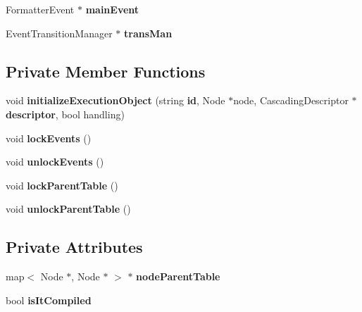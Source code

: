\begin{CompactItemize}
\item 
FormatterEvent $\ast$ {\bf mainEvent}\label{classbr_1_1pucrio_1_1telemidia_1_1ginga_1_1ncl_1_1model_1_1components_1_1ExecutionObject_b7790267ccb53f8cf74564a0da2d8261}

\item 
EventTransitionManager $\ast$ {\bf transMan}\label{classbr_1_1pucrio_1_1telemidia_1_1ginga_1_1ncl_1_1model_1_1components_1_1ExecutionObject_bb5ba1c2216437ee4bd70ac5b22b0826}

\end{CompactItemize}
\subsection*{Private Member Functions}
\begin{CompactItemize}
\item 
void \textbf{initializeExecutionObject} (string {\bf id}, Node $\ast$node, CascadingDescriptor $\ast${\bf descriptor}, bool handling)\label{classbr_1_1pucrio_1_1telemidia_1_1ginga_1_1ncl_1_1model_1_1components_1_1ExecutionObject_ba81c171ec5108aa5422aa5ea52d1dbf}

\item 
void \textbf{lockEvents} ()\label{classbr_1_1pucrio_1_1telemidia_1_1ginga_1_1ncl_1_1model_1_1components_1_1ExecutionObject_fb92f55eccafa46de5cbf8b19fb2ca66}

\item 
void \textbf{unlockEvents} ()\label{classbr_1_1pucrio_1_1telemidia_1_1ginga_1_1ncl_1_1model_1_1components_1_1ExecutionObject_ee9d0674bc2827922500f41e7c3e0849}

\item 
void \textbf{lockParentTable} ()\label{classbr_1_1pucrio_1_1telemidia_1_1ginga_1_1ncl_1_1model_1_1components_1_1ExecutionObject_fe60af0ddc72c507d98aa20687b1c7a7}

\item 
void \textbf{unlockParentTable} ()\label{classbr_1_1pucrio_1_1telemidia_1_1ginga_1_1ncl_1_1model_1_1components_1_1ExecutionObject_4c9ed6796c0c21f0d87c39393eab6343}

\end{CompactItemize}
\subsection*{Private Attributes}
\begin{CompactItemize}
\item 
map$<$ Node $\ast$, Node $\ast$ $>$ $\ast$ {\bf nodeParentTable}\label{classbr_1_1pucrio_1_1telemidia_1_1ginga_1_1ncl_1_1model_1_1components_1_1ExecutionObject_8a247b1405bd03ce6f9e2f0d43b97181}

\item 
bool {\bf isItCompiled}\label{classbr_1_1pucrio_1_1telemidia_1_1ginga_1_1ncl_1_1model_1_1components_1_1ExecutionObject_84c67761d967d0304ec2991b493c5b4d}

\end{CompactItemize}


